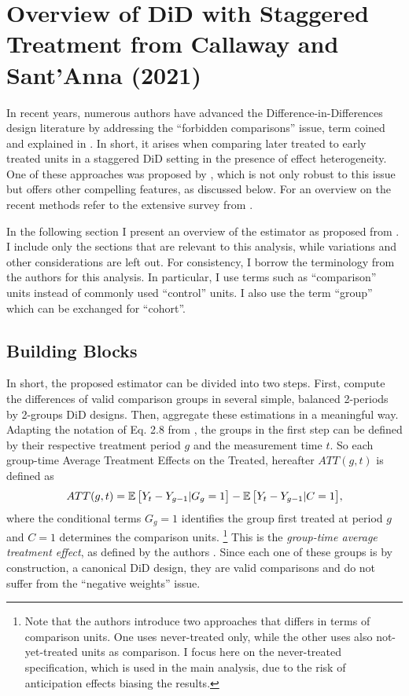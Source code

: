 \chapter{Overview of DiD with Staggered Treatment from Callaway and Sant'Anna (2021)}
\label{sec:overview_did}

In recent years, numerous authors have advanced the Difference-in-Differences
design literature by addressing the ``forbidden comparisons'' issue, term coined and explained in
\textcite[14]{borusyak.etal2024revisiting}. In short, it arises when comparing later treated to early
treated units in a staggered DiD setting in the presence of effect heterogeneity. One of these approaches was proposed by
\textcite{cs2021did_mtp}, which is not only robust to this issue but offers other compelling
features, as discussed below. For an overview on the recent methods refer to the extensive survey from
\textcite{dechaisemartin.dhaultfoeuille2022twoway}.

In the following section I present an overview of the estimator as proposed from
\textcite{cs2021did_mtp}. I include only the sections that are relevant to this analysis,
while variations and other considerations are left out. For consistency, I borrow the terminology from the authors
for this analysis. In particular, I use terms such as ``comparison'' units instead of commonly used
``control'' units. I also use the term ``group'' which can be exchanged for ``cohort''.


\section{Building Blocks}

In short, the proposed estimator can be divided into two steps. First, compute the differences of valid
comparison groups in several simple, balanced 2-periods by 2-groups DiD designs. Then, aggregate
these estimations in a meaningful way. Adapting the notation of Eq. 2.8 from
\parencite{cs2021did_mtp}, the groups in the first step can be defined by their respective treatment
period $g$ and the measurement time $t$. So each group-time Average Treatment Effects on the Treated, 
hereafter $ATT(g,t)$ is defined as%
%
\begin{equation} 
    ATT(g,t) = \operatorname{\mathbb{E}} \big[ Y_{t} - Y_{g-1} | G_{g}=1 \big]  -  \operatorname{\mathbb{E}} \big[ Y_{t} - Y_{g-1} |
    C=1 \big], 
    \label{eq:attgt}
\end{equation}
%
where the conditional terms $G_g=1$ identifies the group first treated at period $g$ and $C=1$
determines the comparison units.%
\footnote{Note that the authors introduce two approaches that differs in terms of comparison units.
    One uses never-treated only, while the other uses also not-yet-treated units as comparison. I focus
    here on the never-treated specification, which is used in the main analysis, due to the risk of
    anticipation effects biasing the results.} %
%
This is the \textit{group-time average treatment effect}, as defined by the authors
\parencite*[Section 2.2]{cs2021did_mtp}. Since each one of these groups is by construction, a
canonical DiD design, they are valid comparisons and do not suffer from the ``negative weights''
issue.

